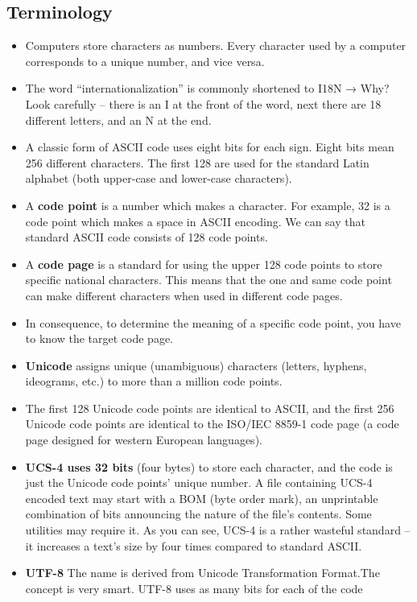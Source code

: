 \documentclass[11pt]{article}
\begin{document}
\subsection{Terminology}
\label{sec:org1b1c238}
\begin{itemize}
\item Computers store characters as numbers. Every character used by a
computer corresponds to a unique number, and vice versa.
\item The word “internationalization” is commonly shortened to I18N → Why?
Look carefully – there is an I at the front of the word, next there
are 18 different letters, and an N at the end.
\item A classic form of ASCII code uses eight bits for each sign. Eight
bits mean 256 different characters. The first 128 are used for the
standard Latin alphabet (both upper-case and lower-case characters).
\item A \textbf{code point} is a number which makes a character. For example, 32
is a code point which makes a space in ASCII encoding. We can say
that standard ASCII code consists of 128 code points.
\item A \textbf{code page} is a standard for using the upper 128 code points to
store specific national characters. This means that the one and same
code point can make different characters when used in different code
pages.
\item In consequence, to determine the meaning of a specific code point,
you have to know the target code page.
\item \textbf{Unicode} assigns unique (unambiguous) characters (letters, hyphens,
ideograms, etc.) to more than a million code points.
\item The first 128 Unicode code points are identical to ASCII, and the
first 256 Unicode code points are identical to the ISO/IEC 8859-1
code page (a code page designed for western European languages).
\item \textbf{UCS-4 uses 32 bits} (four bytes) to store each character, and the
code is just the Unicode code points’ unique number. A file
containing UCS-4 encoded text may start with a BOM (byte order
mark), an unprintable combination of bits announcing the nature of
the file’s contents. Some utilities may require it. As you can see,
UCS-4 is a rather wasteful standard – it increases a text’s size by
four times compared to standard ASCII.
\item \textbf{UTF-8} The name is derived from Unicode Transformation Format.The
concept is very smart. UTF-8 uses as many bits for each of the code

\end{itemize}
\end{document}
